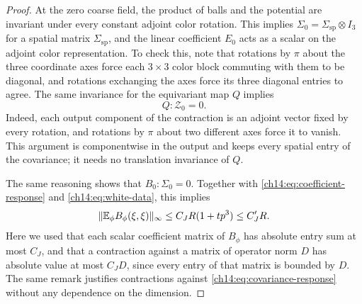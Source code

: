 \begin{proof}
At the zero coarse field, the product of balls and the potential are invariant under every constant adjoint color rotation. This implies $\Sigma_0=\Sigma_{\mathrm{sp}}\otimes I_3$ for a spatial matrix $\Sigma_{\mathrm{sp}}$, and the linear coefficient $E_0$ acts as a scalar on the adjoint color representation. To check this, note that rotations by $\pi$ about the three coordinate axes force each $3\times3$ color block commuting with them to be diagonal, and rotations exchanging the axes force its three diagonal entries to agree. The same invariance for the equivariant map $Q$ implies
\begin{equation}\label{ch14:eq:flat-contraction}
 Q:\mathcal Z_0=0.
\end{equation}
Indeed, each output component of the contraction is an adjoint vector fixed by every rotation, and rotations by $\pi$ about two different axes force it to vanish. This argument is componentwise in the output and keeps every spatial entry of the covariance; it needs no translation invariance of $Q$.

The same reasoning shows that $B_0:\Sigma_0=0$. Together with \eqref{ch14:eq:coefficient-response} and \eqref{ch14:eq:white-data}, this implies
\begin{equation}\label{ch14:eq:quadratic-reconstruction-mean}
 \lVert \mathbb E_\phi B_\phi(\xi,\xi)\rVert_\infty\le C_JR(1+tp^3)\le C_J'R.
\end{equation}
Here we used that each scalar coefficient matrix of $B_\phi$ has absolute entry sum at most $C_J$, and that a contraction against a matrix of operator norm $D$ has absolute value at most $C_JD$, since every entry of that matrix is bounded by $D$. The same remark justifies contractions against \eqref{ch14:eq:covariance-response} without any dependence on the dimension.


\end{proof}
